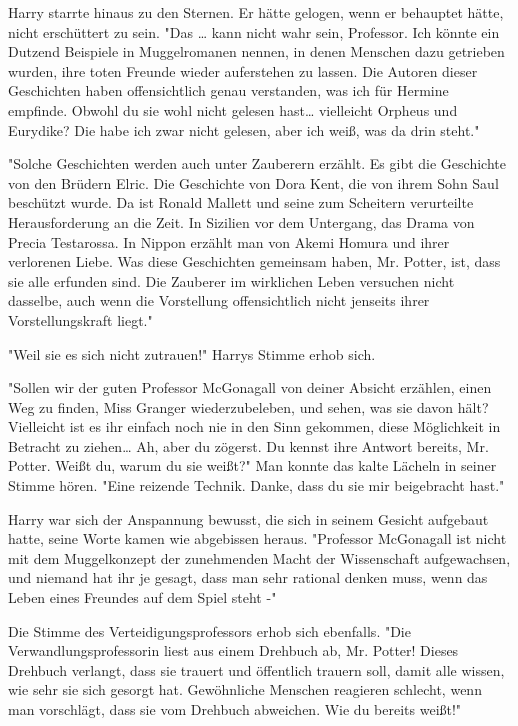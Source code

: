 {Harry starrte hinaus zu den Sternen. Er hätte gelogen, wenn er behauptet hätte, nicht erschüttert zu sein. "Das … kann nicht wahr sein, Professor. Ich könnte ein Dutzend Beispiele in Muggelromanen nennen, in denen Menschen dazu getrieben wurden, ihre toten Freunde wieder auferstehen zu lassen. Die Autoren dieser Geschichten haben offensichtlich genau verstanden, was ich für Hermine empfinde. Obwohl du sie wohl nicht gelesen hast… vielleicht Orpheus und Eurydike? Die habe ich zwar nicht gelesen, aber ich weiß, was da drin steht."

"Solche Geschichten werden auch unter Zauberern erzählt. Es gibt die Geschichte von den Brüdern Elric. Die Geschichte von Dora Kent, die von ihrem Sohn Saul beschützt wurde. Da ist Ronald Mallett und seine zum Scheitern verurteilte Herausforderung an die Zeit. In Sizilien vor dem Untergang, das Drama von Precia Testarossa. In Nippon erzählt man von Akemi Homura und ihrer verlorenen Liebe. Was diese Geschichten gemeinsam haben, Mr. Potter, ist, dass sie alle erfunden sind. Die Zauberer im wirklichen Leben versuchen nicht dasselbe, auch wenn die Vorstellung offensichtlich nicht jenseits ihrer Vorstellungskraft liegt."

"Weil sie es sich nicht zutrauen!" Harrys Stimme erhob sich.

"Sollen wir der guten Professor McGonagall von deiner Absicht erzählen, einen Weg zu finden, Miss Granger wiederzubeleben, und sehen, was sie davon hält? Vielleicht ist es ihr einfach noch nie in den Sinn gekommen, diese Möglichkeit in Betracht zu ziehen… Ah, aber du zögerst. Du kennst ihre Antwort bereits, Mr. Potter. Weißt du, warum du sie weißt?" Man konnte das kalte Lächeln in seiner Stimme hören. "Eine reizende Technik. Danke, dass du sie mir beigebracht hast."

Harry war sich der Anspannung bewusst, die sich in seinem Gesicht aufgebaut hatte, seine Worte kamen wie abgebissen heraus. "Professor McGonagall ist nicht mit dem Muggelkonzept der zunehmenden Macht der Wissenschaft aufgewachsen, und niemand hat ihr je gesagt, dass man sehr rational denken muss, wenn das Leben eines Freundes auf dem Spiel steht -"

Die Stimme des Verteidigungsprofessors erhob sich ebenfalls. "Die Verwandlungsprofessorin liest aus einem Drehbuch ab, Mr. Potter! Dieses Drehbuch verlangt, dass sie trauert und öffentlich trauern soll, damit alle wissen, wie sehr sie sich gesorgt hat. Gewöhnliche Menschen reagieren schlecht, wenn man vorschlägt, dass sie vom Drehbuch abweichen. Wie du bereits weißt!"

}
